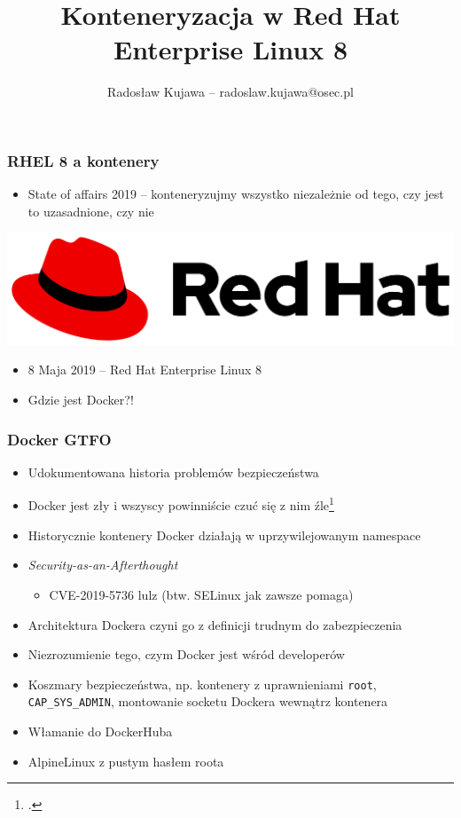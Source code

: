 \documentclass[dvipsnames,table]{beamer}
\title{Konteneryzacja w Red Hat Enterprise Linux 8}
\author{Radosław Kujawa -- radoslaw.kujawa@osec.pl}
\institute{OSEC}
\begin{document}
\begin{frame}
	\titlepage
\end{frame}

\begin{frame}
\frametitle{RHEL 8 a kontenery}
	\begin{itemize}
		\item State of affairs 2019 -- konteneryzujmy wszystko niezależnie od tego, czy jest to uzasadnione, czy nie
	\end{itemize}
	\begin{center}
		\includegraphics[scale=0.1]{img-rhlogo.png}
	\end{center}
	\begin{itemize}
		\item 8 Maja 2019 -- Red Hat Enterprise Linux 8
		\item Gdzie jest Docker?!
	\end{itemize}
\end{frame}

\begin{frame}
	\frametitle{Docker GTFO}
	\begin{itemize}
		\item Udokumentowana historia problemów bezpieczeństwa
		\item Docker jest zły i wszyscy powinniście czuć się z nim źle\footcite{Barcamp2016}
		\item Historycznie kontenery Docker działają w uprzywilejowanym namespace
		\item {\it Security-as-an-Afterthought}
		\begin{itemize}
			\item CVE-2019-5736 lulz (btw. SELinux jak zawsze pomaga)
		\end{itemize}
		\item Architektura Dockera czyni go z definicji trudnym do zabezpieczenia
		\item Niezrozumienie tego, czym Docker jest wśród developerów
		\item Koszmary bezpieczeństwa, np. kontenery z uprawnieniami {\tt root}, {\tt CAP\_SYS\_ADMIN}, montowanie socketu Dockera wewnątrz kontenera
		\item Włamanie do DockerHuba
		\item AlpineLinux z pustym hasłem roota
	\end{itemize}
\end{frame}
\end{document}
